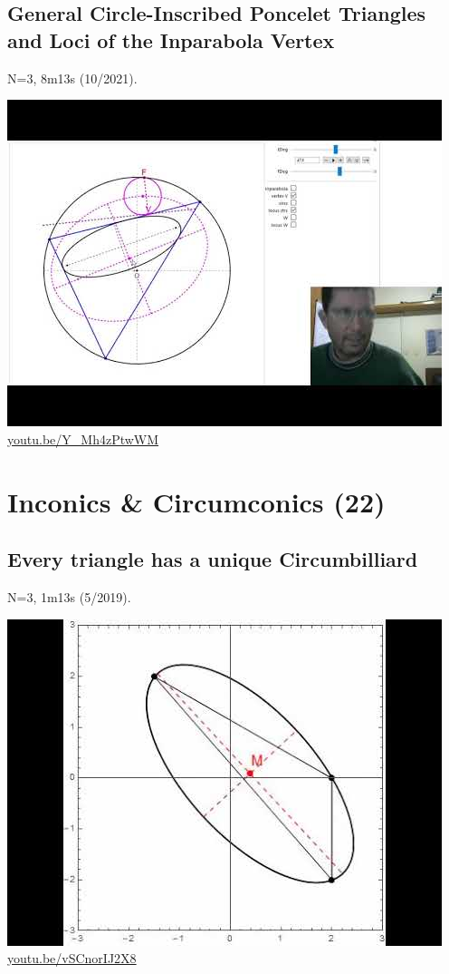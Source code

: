 \documentclass[12pt]{amsart}
\begin{document}
\subsection{General Circle-Inscribed Poncelet Triangles and Loci of the Inparabola Vertex}
\label{vid:Y_Mh4zPtwWM}
\noindent N=3, 8m13s (10/2021). 
\begin{center}\includegraphics[width=.5\textwidth]{pics/Y_Mh4zPtwWM.jpg} \\ 
\href{https://youtu.be/Y_Mh4zPtwWM}{\url{youtu.be/Y\_Mh4zPtwWM}}\end{center}
% 

\section{Inconics \& Circumconics (22)}

\subsection{Every triangle has a unique Circumbilliard}
\label{vid:vSCnorIJ2X8}
\noindent N=3, 1m13s (5/2019). 
\begin{center}\includegraphics[width=.5\textwidth]{pics/vSCnorIJ2X8.jpg} \\ 
\href{https://youtu.be/vSCnorIJ2X8}{\url{youtu.be/vSCnorIJ2X8}}\end{center}
% 
\end{document}
